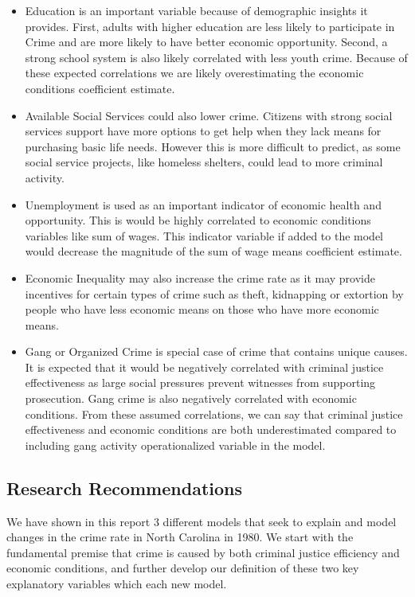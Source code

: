 \documentclass[]{article}
\providecommand{\tightlist}{%
  \setlength{\itemsep}{0pt}\setlength{\parskip}{0pt}}
\begin{document}
\begin{itemize}
\tightlist
\item
  Education is an important variable because of demographic insights it
  provides. First, adults with higher education are less likely to
  participate in Crime and are more likely to have better economic
  opportunity. Second, a strong school system is also likely correlated
  with less youth crime. Because of these expected correlations we are
  likely overestimating the economic conditions coefficient estimate.
\item
  Available Social Services could also lower crime. Citizens with strong
  social services support have more options to get help when they lack
  means for purchasing basic life needs. However this is more difficult
  to predict, as some social service projects, like homeless shelters,
  could lead to more criminal activity.
\item
  Unemployment is used as an important indicator of economic health and
  opportunity. This is would be highly correlated to economic conditions
  variables like sum of wages. This indicator variable if added to the
  model would decrease the magnitude of the sum of wage means
  coefficient estimate.\\
\item
  Economic Inequality may also increase the crime rate as it may provide
  incentives for certain types of crime such as theft, kidnapping or
  extortion by people who have less economic means on those who have
  more economic means.
\item
  Gang or Organized Crime is special case of crime that contains unique
  causes. It is expected that it would be negatively correlated with
  criminal justice effectiveness as large social pressures prevent
  witnesses from supporting prosecution. Gang crime is also negatively
  correlated with economic conditions. From these assumed correlations,
  we can say that criminal justice effectiveness and economic conditions
  are both underestimated compared to including gang activity
  operationalized variable in the model.
\end{itemize}

\hypertarget{research-recommendations}{%
\subsection{Research Recommendations}\label{research-recommendations}}

We have shown in this report 3 different models that seek to explain and
model changes in the crime rate in North Carolina in 1980. We start with
the fundamental premise that crime is caused by both criminal justice
efficiency and economic conditions, and further develop our definition
of these two key explanatory variables which each new model.
\end{document}
